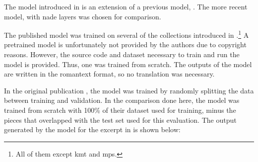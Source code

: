 
The model introduced in \textcite{micchi2021deep} is an
extension of a previous model, \textcite{micchi2020not}. The
more recent model, with \gls{nade} layers was chosen for
comparison.

The published model was trained on several of the
collections introduced in
.\footnote{All of
them except \gls{kmt} and \gls{mps}.} A pretrained model is
unfortunately not provided by the authors due to copyright
reasons. However, the source code and dataset necessary to
train and run the model is provided. Thus, one was trained
from scratch. The outputs of the model are written in the
\gls{romantext} format, so no translation was necessary. 

In the original publication \parencite{micchi2021deep}, the
model was trained by randomly splitting the data between
training and validation. In the comparison done here, the
model was trained from scratch with 100\% of their dataset
used for training, minus the pieces that overlapped with the
test set used for this evaluation. The output generated by
the model for the excerpt in  is shown
below:

    
